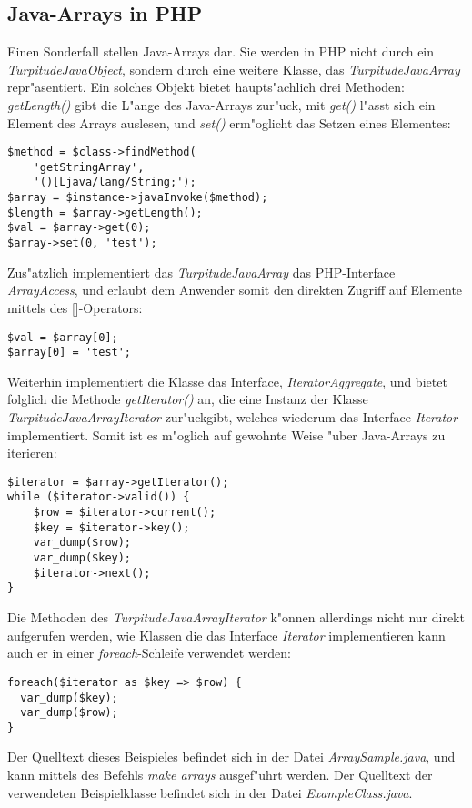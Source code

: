 \subsection{Java-Arrays in PHP}
\label{sec:app1:arrays}

Einen Sonderfall stellen Java-Arrays dar. Sie werden in PHP nicht durch ein \emph{TurpitudeJavaObject},
sondern durch eine weitere Klasse, das \emph{TurpitudeJavaArray} repr"asentiert. Ein solches Objekt bietet
haupts"achlich drei Methoden: \emph{getLength()} gibt die L"ange des Java-Arrays zur"uck, mit \emph{get()} 
l"asst sich ein Element des Arrays auslesen, und \emph{set()} erm"oglicht das Setzen eines Elementes:
\begin{lstlisting}[caption=Normaler Zugriff auf ein TurpitudeJavaArray]
$method = $class->findMethod(
    'getStringArray', 
    '()[Ljava/lang/String;');
$array = $instance->javaInvoke($method);
$length = $array->getLength();
$val = $array->get(0);
$array->set(0, 'test');
\end{lstlisting}
Zus"atzlich implementiert das \emph{TurpitudeJavaArray} das PHP-Interface \emph{ArrayAccess}, und erlaubt
dem Anwender somit den direkten Zugriff auf Elemente mittels des []-Operators:
\begin{lstlisting}[caption=Klammern-Operator]
$val = $array[0];
$array[0] = 'test';
\end{lstlisting}
Weiterhin implementiert die Klasse das Interface, \emph{IteratorAggregate}, und bietet folglich die Methode
\emph{getIterator()} an, die eine Instanz der Klasse \emph{TurpitudeJavaArrayIterator} zur"uckgibt, welches
wiederum das Interface \emph{Iterator} implementiert. Somit ist es m"oglich auf gewohnte Weise "uber
Java-Arrays zu iterieren:
\begin{lstlisting}[caption=Iterator]
$iterator = $array->getIterator();
while ($iterator->valid()) {
    $row = $iterator->current();
    $key = $iterator->key();
    var_dump($row);
    var_dump($key);
    $iterator->next();
}
\end{lstlisting}
Die Methoden des \emph{TurpitudeJavaArrayIterator} k"onnen allerdings nicht nur direkt aufgerufen werden,
wie Klassen die das Interface \emph{Iterator} implementieren kann auch er in einer \emph{foreach}-Schleife
verwendet werden:
\begin{lstlisting}[caption=Iterator in einer foreach-Schleife]
foreach($iterator as $key => $row) {
  var_dump($key);
  var_dump($row);
}
\end{lstlisting}

Der Quelltext dieses Beispieles befindet sich in der Datei \emph{ArraySample.java}, 
und kann mittels des Befehls \emph{make arrays} ausgef"uhrt werden. Der Quelltext der
verwendeten Beispielklasse befindet sich in der Datei \emph{ExampleClass.java}.


